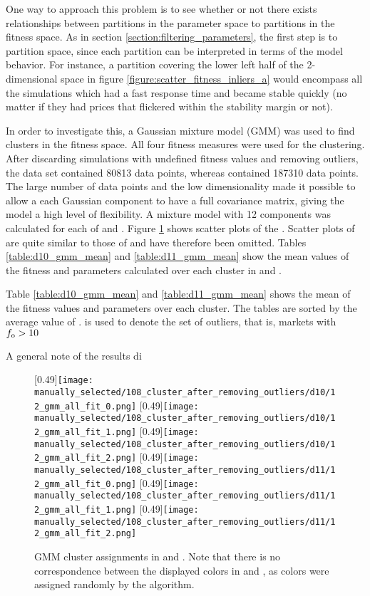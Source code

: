One way to approach this problem is to see whether or not there exists relationships between partitions in the parameter space to partitions in the fitness space. As in section \ref{section:filtering_parameters}, the first step is to partition space, since each partition can be interpreted in terms of the model behavior. For instance, a partition covering the lower left half of the 2-dimensional space in figure \ref{figure:scatter_fitness_inliers_a} would encompass all the simulations which had a fast response time and became stable quickly (no matter if they had prices that flickered within the stability margin or not).

In order to investigate this, a Gaussian mixture model (GMM) was used to find clusters in the fitness space. All four fitness measures were used for the clustering. After discarding simulations with undefined fitness values and removing outliers, the data set \dten{} contained 80813 data points, whereas \deleven{} contained 187310 data points. The large number of data points and the low dimensionality made it possible to allow a each Gaussian component to have a full covariance matrix, giving the model a high level of flexibility. A mixture model with 12 components was calculated for each of \dten{} and \deleven. Figure \ref{fig:d10_scatter_clusters} shows scatter plots of the . Scatter plots of \deleven{} are quite similar to those of \dten{} and have therefore been omitted. Tables \ref{table:d10_gmm_mean} and \ref{table:d11_gmm_mean} show the mean values of the fitness and parameters calculated over each cluster in \dten{} and \deleven. 


Table \ref{table:d10_gmm_mean} and  \ref{table:d11_gmm_mean} shows the mean of the fitness values and parameters over each cluster. The tables are sorted by the average value of \overshoot. \outliers{} is used to denote the set of outliers, that is, markets with $f_\text{o} > 10$


A general note of the results di
\begin{figure}
	\centering
	\subcaptionbox{\dten}[0.49\linewidth]{\texttt{[image: manually\_selected/108\_cluster\_after\_removing\_outliers/d10/12\_gmm\_all\_fit\_0.png]}}
	\subcaptionbox{\dten}[0.49\linewidth]{\texttt{[image: manually\_selected/108\_cluster\_after\_removing\_outliers/d10/12\_gmm\_all\_fit\_1.png]}}
	\subcaptionbox{\dten}[0.49\linewidth]{\texttt{[image: manually\_selected/108\_cluster\_after\_removing\_outliers/d10/12\_gmm\_all\_fit\_2.png]}}
	\subcaptionbox{\deleven}[0.49\linewidth]{\texttt{[image: manually\_selected/108\_cluster\_after\_removing\_outliers/d11/12\_gmm\_all\_fit\_0.png]}}
	\subcaptionbox{\deleven}[0.49\linewidth]{\texttt{[image: manually\_selected/108\_cluster\_after\_removing\_outliers/d11/12\_gmm\_all\_fit\_1.png]}}
	\subcaptionbox{\deleven}[0.49\linewidth]{\texttt{[image: manually\_selected/108\_cluster\_after\_removing\_outliers/d11/12\_gmm\_all\_fit\_2.png]}}
	\caption{GMM cluster assignments in \dten{} and \deleven. Note that there is no correspondence between the displayed colors in \dten{} and \deleven, as colors were assigned randomly by the algorithm.}
	\label{fig:d10_scatter_clusters}
\end{figure}

